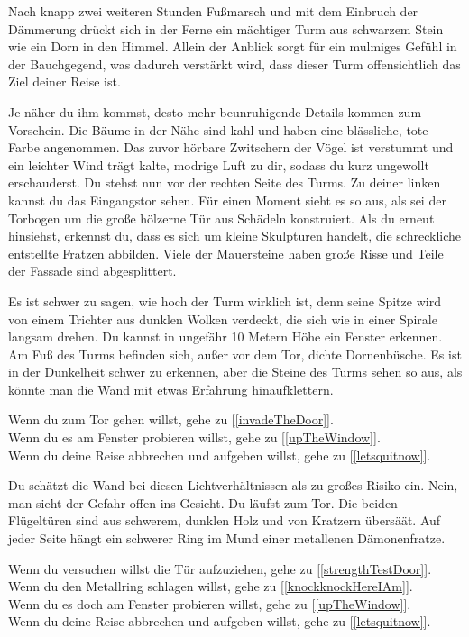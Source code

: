 
Nach knapp zwei weiteren Stunden Fußmarsch und mit dem Einbruch der Dämmerung drückt sich in der Ferne ein mächtiger Turm aus schwarzem Stein wie ein Dorn in den Himmel. Allein der Anblick sorgt für ein mulmiges Gefühl in der Bauchgegend, was dadurch verstärkt wird, dass dieser Turm offensichtlich das Ziel deiner Reise ist.

Je näher du ihm kommst, desto mehr beunruhigende Details kommen zum Vorschein. Die Bäume in der Nähe sind kahl und haben eine blässliche, tote Farbe angenommen. Das zuvor hörbare Zwitschern der Vögel ist verstummt und ein leichter Wind trägt kalte, modrige Luft zu dir, sodass du kurz ungewollt erschauderst. Du stehst nun vor der rechten Seite des Turms. Zu deiner linken kannst du das Eingangstor sehen. Für einen Moment sieht es so aus, als sei der Torbogen um die große hölzerne Tür aus Schädeln konstruiert. Als du erneut hinsiehst, erkennst du, dass es sich um kleine Skulpturen handelt, die schreckliche entstellte Fratzen abbilden. Viele der Mauersteine haben große Risse und Teile der Fassade sind abgesplittert.

Es ist schwer zu sagen, wie hoch der Turm wirklich ist, denn seine Spitze wird von einem Trichter aus dunklen Wolken verdeckt, die sich wie in einer Spirale langsam drehen. Du kannst in ungefähr 10 Metern Höhe ein Fenster erkennen. Am Fuß des Turms befinden sich, außer vor dem Tor, dichte Dornenbüsche. Es ist in der Dunkelheit schwer zu erkennen, aber die Steine des Turms sehen so aus, als könnte man die Wand mit etwas Erfahrung hinaufklettern.

Wenn du zum Tor gehen willst, gehe zu [\ref{invadeTheDoor}].
\\Wenn du es am Fenster probieren willst, gehe zu [\ref{upTheWindow}].
\\Wenn du deine Reise abbrechen und aufgeben willst, gehe zu [\ref{letsquitnow}].


Du schätzt die Wand bei diesen Lichtverhältnissen als zu großes Risiko ein. Nein, man sieht der Gefahr offen ins Gesicht. Du läufst zum Tor. Die beiden Flügeltüren sind aus schwerem, dunklen Holz und von Kratzern übersäät. Auf jeder Seite hängt ein schwerer Ring im Mund einer metallenen Dämonenfratze.

Wenn du versuchen willst die Tür aufzuziehen, gehe zu [\ref{strengthTestDoor}].
\\Wenn du den Metallring schlagen willst, gehe zu [\ref{knockknockHereIAm}].
\\Wenn du es doch am Fenster probieren willst, gehe zu [\ref{upTheWindow}].
\\Wenn du deine Reise abbrechen und aufgeben willst, gehe zu [\ref{letsquitnow}].

